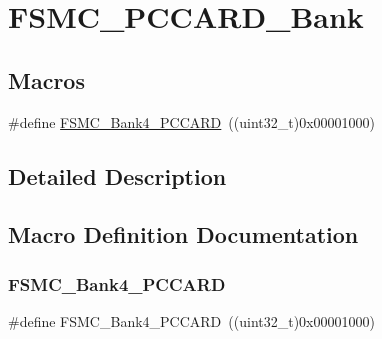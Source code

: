 \hypertarget{group___f_s_m_c___p_c_c_a_r_d___bank}{}\section{F\+S\+M\+C\+\_\+\+P\+C\+C\+A\+R\+D\+\_\+\+Bank}
\label{group___f_s_m_c___p_c_c_a_r_d___bank}
\subsection*{Macros}
\begin{DoxyCompactItemize}
\item 
\#define \mbox{\hyperlink{group___f_s_m_c___p_c_c_a_r_d___bank_gad08ce7c7afc462f3d9ef085b05d42387}{F\+S\+M\+C\+\_\+\+Bank4\+\_\+\+P\+C\+C\+A\+RD}}~((uint32\+\_\+t)0x00001000)
\end{DoxyCompactItemize}


\subsection{Detailed Description}


\subsection{Macro Definition Documentation}
\mbox{\label{group___f_s_m_c___p_c_c_a_r_d___bank_gad08ce7c7afc462f3d9ef085b05d42387}} 
\subsubsection{\texorpdfstring{FSMC\_Bank4\_PCCARD}{FSMC\_Bank4\_PCCARD}}
{\footnotesize\ttfamily \#define F\+S\+M\+C\+\_\+\+Bank4\+\_\+\+P\+C\+C\+A\+RD~((uint32\+\_\+t)0x00001000)}

